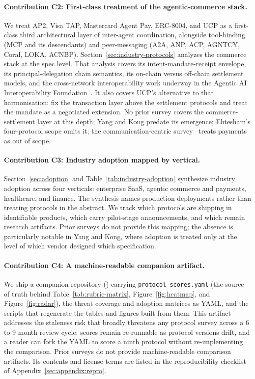 \paragraph{Contribution C2: First-class treatment of the
agentic-commerce stack.}
We treat AP2, Visa TAP, Mastercard Agent Pay, ERC-8004, and UCP as a
first-class third architectural layer of inter-agent coordination,
alongside tool-binding (MCP and its descendants) and peer-messaging
(A2A, ANP, ACP, AGNTCY, Coral, LOKA, ACNBP). Section~\ref{sec:industry-protocols}
analyzes the commerce stack at the spec level. That analysis covers
its intent-mandate-receipt envelope, its principal-delegation chain
semantics, its on-chain versus off-chain settlement models, and
the cross-network interoperability work underway in the Agentic
AI Interoperability Foundation~\cite{lf_aaif}. It also covers UCP's
alternative to that harmonisation: fix the transaction layer above
the settlement protocols and treat the mandate as a negotiated
extension. No prior survey
covers the commerce-settlement layer at this depth; Yang and
Kong predate its emergence; Ehtesham's four-protocol scope omits
it; the communication-centric survey~\cite{commcentric2025survey}
treats payments as out of scope.

\paragraph{Contribution C3: Industry adoption mapped by vertical.}
Section~\ref{sec:adoption} and Table~\ref{tab:industry-adoption}
synthesize industry adoption across four verticals: enterprise
SaaS, agentic commerce and payments, healthcare, and finance. The
synthesis names production deployments rather than treating protocols
in the abstract. We track which protocols are shipping in identifiable
products, which carry pilot-stage announcements, and which remain
research artifacts. Prior surveys do not provide this mapping; the
absence is particularly notable in Yang and Kong, where adoption
is treated only at the level of which vendor designed which
specification.

\paragraph{Contribution C4: A machine-readable companion artifact.}
We ship a companion repository (\companionrepo) carrying \texttt{protocol-scores.yaml}
(the source of truth behind Table~\ref{tab:rubric-matrix},
Figure~\ref{fig:heatmap}, and Figure~\ref{fig:radar}), the threat
coverage and adoption matrices as YAML, and the scripts that
regenerate the tables and figures built from them. This artifact addresses the
staleness risk that broadly threatens any protocol survey across
a 6 to 9 month review cycle: scores remain re-runnable as protocol
versions drift, and a reader can fork the YAML to score a ninth
protocol without re-implementing the comparison. Prior surveys do
not provide machine-readable comparison artifacts. Its contents
and license terms are listed in the reproducibility checklist of
Appendix~\ref{sec:appendix:repro}.

